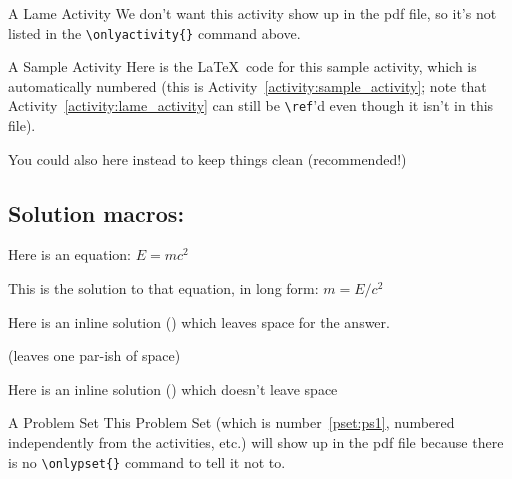 \documentclass[12pt]{article}
\author{} %
\date{} %
\begin{document}
\begin{activity}{A Lame Activity}
	We don't want this activity show up in the pdf file, so it's not listed in the \verb|\onlyactivity{}| command above.
\end{activity}

\begin{activity}{A Sample Activity}
	Here is the \LaTeX\ code for this sample activity, which is automatically numbered (this is Activity~\ref{activity:sample_activity}; note that Activity~\ref{activity:lame_activity} can still be \verb|\ref|'d even though it isn't in this file).
	
	You could also \verb|| here instead to keep things clean (recommended!)
	
	\subsection*{Solution macros:}
		Here is an equation: $E=mc^2$
	\begin{solution}
	    This is the solution to that equation, in long form: $m=E/c^2$
	\end{solution}

	    Here is an inline solution () which leaves space for the answer.
    
	     (leaves one par-ish of space)
   
	   	Here is an inline solution () which doesn't leave space
\end{activity}

\begin{pset}[ps1]{A Problem Set}
	This Problem Set (which is number~\ref{pset:ps1}, numbered independently from the activities, etc.) will show up in the pdf file because there is no \verb|\onlypset{}| command to tell it not to.
\end{pset}
\end{document}
